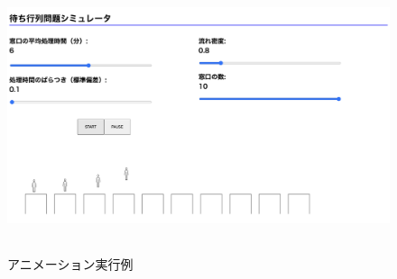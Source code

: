 \documentclass[12pt,a4j]{ltjsarticle}
\begin{document}
\begin{figure}[h]
\begin{center}
\includegraphics[height = 80mm ] {figures/lay_anime.pdf}
\caption{アニメーション実行例}
\label{fig:アニメ実行}
\end{center}
\end{figure}

\clearpage
\end{document}
